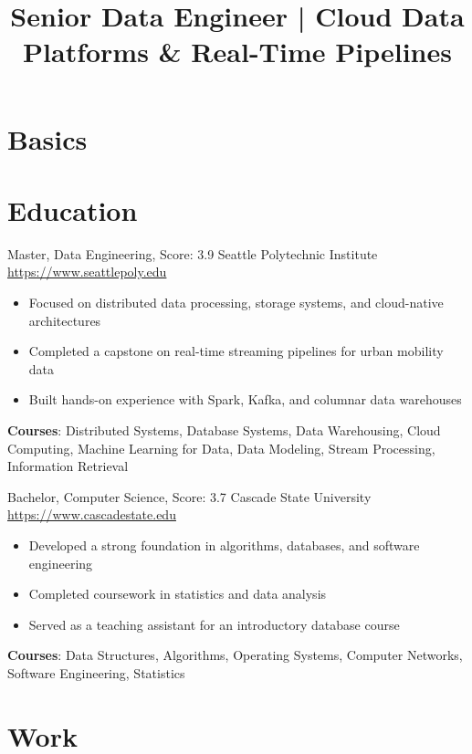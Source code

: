 \documentclass[a4paper, serif, 10pt]{moderncv}
\title{Senior Data Engineer | Cloud Data Platforms \& Real-Time Pipelines}
\begin{document}
\maketitle

\section{Basics}

\section{Education}

        {Master, Data Engineering, Score: 3.9}
        {Seattle Polytechnic Institute}
        {\url{https://www.seattlepoly.edu}}
        {}
        {\begin{itemize}
\item Focused on distributed data processing, storage systems, and cloud-native architectures
\item Completed a capstone on real-time streaming pipelines for urban mobility data
\item Built hands-on experience with Spark, Kafka, and columnar data warehouses
\end{itemize}
\textbf{Courses}: Distributed Systems, Database Systems, Data Warehousing, Cloud Computing, Machine Learning for Data, Data Modeling, Stream Processing, Information Retrieval}

        {Bachelor, Computer Science, Score: 3.7}
        {Cascade State University}
        {\url{https://www.cascadestate.edu}}
        {}
        {\begin{itemize}
\item Developed a strong foundation in algorithms, databases, and software engineering
\item Completed coursework in statistics and data analysis
\item Served as a teaching assistant for an introductory database course
\end{itemize}
\textbf{Courses}: Data Structures, Algorithms, Operating Systems, Computer Networks, Software Engineering, Statistics}
\section{Work}
\end{document}
